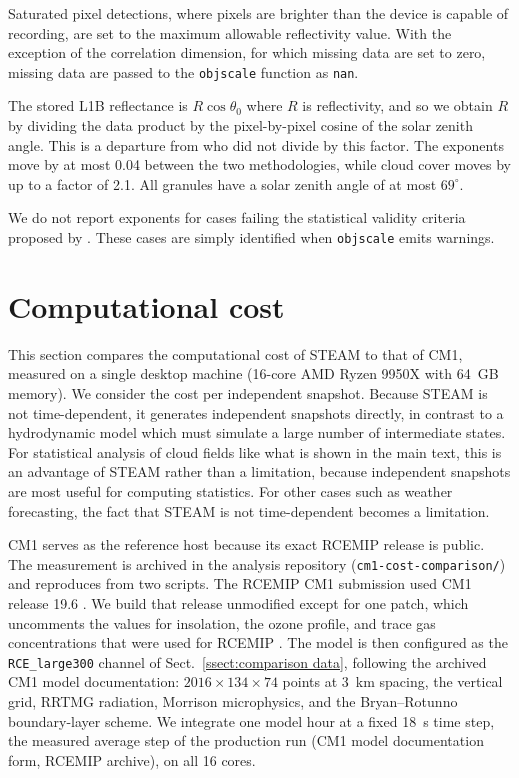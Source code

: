 \documentclass{article}
\begin{document}
Saturated pixel detections, where pixels are brighter than the device is capable of recording, are set to the maximum allowable reflectivity value. With the exception of the correlation dimension, for which missing data are set to zero, missing data are passed to the \verb|objscale| function as \verb|nan|.

The stored L1B reflectance is $R\cos\theta_0$ where $R$ is reflectivity, and so we obtain $R$ by dividing the data product by the pixel-by-pixel cosine of the solar zenith angle. This is a departure from \citet{dewitt2026} who did not divide by this factor. The exponents move by at most 0.04 between the two methodologies,
while cloud cover moves by up to a factor of 2.1. All granules have a solar zenith angle of at most $69^\circ$.

We do not report exponents for cases failing the statistical validity criteria proposed by \citet{dewitt2024b,dewitt2026}. These cases are simply identified when \verb|objscale| emits warnings.

\section{Computational cost}
\label{sect:computational cost}

This section compares the computational cost of STEAM to that of CM1, 
measured on a single desktop machine
(16-core AMD Ryzen 9950X with 64~GB memory). We consider the cost per independent snapshot.
Because STEAM is not time-dependent, it generates independent snapshots directly, in contrast to
a hydrodynamic model which must simulate a large number of intermediate states. For statistical analysis of cloud fields like what is shown in the main text, this is an advantage of STEAM rather than a limitation, because independent snapshots are most useful for computing statistics. For other cases such as weather forecasting, the fact that STEAM is not time-dependent becomes a limitation.


CM1 serves as the reference
host because its exact RCEMIP release is public. The measurement is
archived in the analysis repository (\texttt{cm1-cost-comparison/})
and reproduces from two scripts.
The RCEMIP CM1 submission used CM1 release 19.6
\citep{wing2020}. We build that release unmodified except
for one patch, which uncomments the values for 
insolation, the ozone profile, and trace gas concentrations that were used for RCEMIP
\citep{wing2018}. The model is then configured as the
\texttt{RCE\_large300} channel of Sect.~\ref{ssect:comparison data},
following the archived CM1 model documentation: $2016 \times 134
\times 74$ points at 3~km spacing, the \citet{wing2018} vertical
grid, RRTMG radiation, Morrison microphysics, and the Bryan--Rotunno
boundary-layer scheme. We integrate one model hour at a fixed 18~s
time step, the measured average step of the production run (CM1 model documentation form, RCEMIP archive), on all 16 cores.
\end{document}
